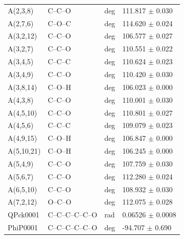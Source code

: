 \begin{landscape}
\begin{longtable}{llll}
A(2,3,8) & C--C--O & deg & 111.817 $\pm$ 0.030 \\
A(2,7,6) & C--O--C & deg & 114.620 $\pm$ 0.024 \\
A(3,2,12) & C--C--O & deg & 106.577 $\pm$ 0.027 \\
A(3,2,7) & C--C--O & deg & 110.551 $\pm$ 0.022 \\
A(3,4,5) & C--C--C & deg & 110.624 $\pm$ 0.023 \\
A(3,4,9) & C--C--O & deg & 110.420 $\pm$ 0.030 \\
A(3,8,14) & C--O--H & deg & 106.023 $\pm$ 0.000 \\
A(4,3,8) & C--C--O & deg & 110.001 $\pm$ 0.030 \\
A(4,5,10) & C--C--O & deg & 110.801 $\pm$ 0.027 \\
A(4,5,6) & C--C--C & deg & 109.079 $\pm$ 0.023 \\
A(4,9,15) & C--O--H & deg & 106.847 $\pm$ 0.000 \\
A(5,10,21) & C--O--H & deg & 106.245 $\pm$ 0.000 \\
A(5,4,9) & C--C--O & deg & 107.759 $\pm$ 0.030 \\
A(5,6,7) & C--C--O & deg & 112.280 $\pm$ 0.024 \\
A(6,5,10) & C--C--O & deg & 108.932 $\pm$ 0.030 \\
A(7,2,12) & O--C--O & deg & 112.075 $\pm$ 0.028 \\
QPck0001 & C--C--C--C--C--O & rad & 0.06526 $\pm$ 0.0008 \\
PhiP0001 & C--C--C--C--C--O & deg & -94.707 $\pm$ 0.690 \\
\bottomrule
\end{longtable}
\end{landscape}

